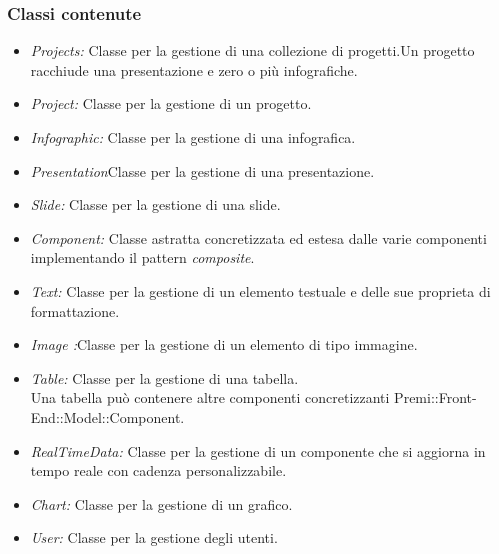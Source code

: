 	\subsubsection{Classi contenute}
		\begin{itemize}
		 \item \textit{Projects: }Classe per la gestione di una collezione di progetti.Un progetto racchiude una presentazione e zero o più infografiche.
		\end{itemize}
		\begin{itemize}
		 \item  \textit{Project: }Classe per la gestione di un progetto.
		\end{itemize}
		\begin{itemize}
		 \item  \textit{Infographic: }Classe per la gestione di una infografica.
		\end{itemize}
		\begin{itemize}
		 \item  \textit{Presentation}Classe per la gestione di una presentazione.
		\end{itemize}
		\begin{itemize}
		 \item  \textit{Slide: }Classe per la gestione di una slide.
		\end{itemize}
		\begin{itemize}
		 \item  \textit{Component: }Classe astratta concretizzata ed estesa dalle varie componenti implementando il pattern \textit{composite}.
		\end{itemize}
		\begin{itemize}
		 \item  \textit{Text: }Classe per la gestione di un elemento testuale e delle sue proprieta di formattazione.
		\end{itemize}
		\begin{itemize}
		 \item  \textit{Image :}Classe per la gestione di un elemento di tipo immagine.
		\end{itemize}
		\begin{itemize}
		 \item  \textit{Table: }Classe per la gestione di una tabella. \\Una tabella può contenere altre componenti concretizzanti Premi::Front-End::Model::Component.
		\end{itemize}
		\begin{itemize}
		 \item  \textit{RealTimeData: }Classe per la gestione di un componente che si aggiorna in tempo reale con cadenza personalizzabile.
		\end{itemize}
		\begin{itemize}
		 \item  \textit{Chart: }Classe per la gestione di un grafico.
		\end{itemize}
		\begin{itemize}
		 \item  \textit{User: }Classe per la gestione degli utenti.
		\end{itemize}
